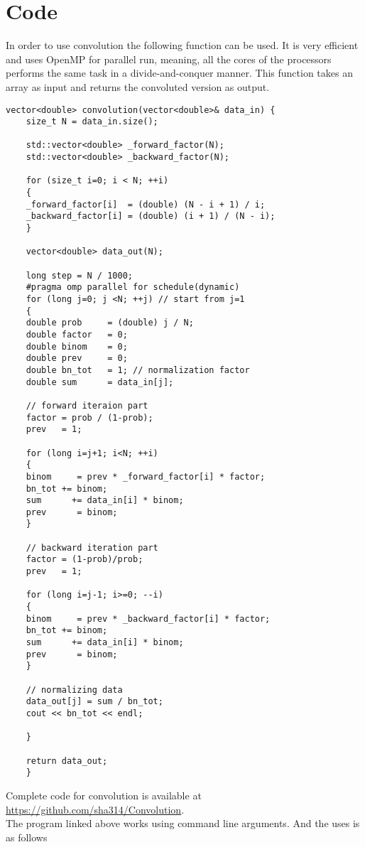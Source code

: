 \section{Code}
	In order to use convolution the following function can be used. It is very efficient and uses OpenMP for parallel run, meaning, all the cores of the processors performs the same task in a divide-and-conquer manner. This function takes an array as input and returns the convoluted version as output.
	\begin{lstlisting}[style=CStyle]
	vector<double> convolution(vector<double>& data_in) {
	size_t N = data_in.size();
	
	std::vector<double> _forward_factor(N);
	std::vector<double> _backward_factor(N);
	
	for (size_t i=0; i < N; ++i)
	{
	_forward_factor[i]  = (double) (N - i + 1) / i;
	_backward_factor[i] = (double) (i + 1) / (N - i);
	}
	
	vector<double> data_out(N);

	long step = N / 1000;
	#pragma omp parallel for schedule(dynamic)
	for (long j=0; j <N; ++j) // start from j=1
	{
	double prob     = (double) j / N;
	double factor   = 0;
	double binom    = 0;
	double prev     = 0;
	double bn_tot   = 1; // normalization factor
	double sum      = data_in[j];
	
	// forward iteraion part
	factor = prob / (1-prob);
	prev   = 1;
	
	for (long i=j+1; i<N; ++i)
	{
	binom     = prev * _forward_factor[i] * factor;
	bn_tot += binom;
	sum      += data_in[i] * binom;
	prev      = binom;
	}
	
	// backward iteration part
	factor = (1-prob)/prob;
	prev   = 1;
	
	for (long i=j-1; i>=0; --i)
	{
	binom     = prev * _backward_factor[i] * factor;
	bn_tot += binom;
	sum      += data_in[i] * binom;
	prev      = binom;
	}
	
	// normalizing data
	data_out[j] = sum / bn_tot;
	cout << bn_tot << endl;
	
	}

	return data_out;
	}
	\end{lstlisting}
Complete code for convolution is available at 
\url{https://github.com/sha314/Convolution}.\\

The program linked above works using command line arguments. And the uses is as follows\\


